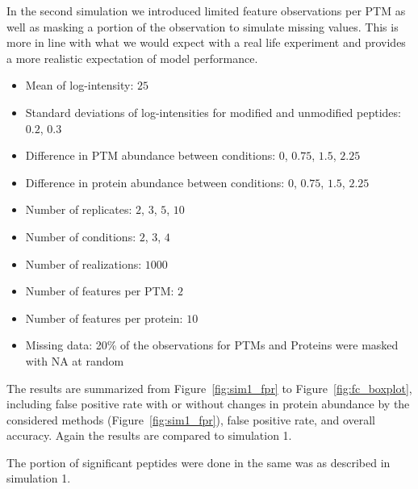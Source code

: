 \documentclass{mcp}
\def\sfigref#1{{Figure~\ref{#1}}}
\begin{document}
In the second simulation we introduced limited feature observations per PTM as well as masking a portion of the observation to simulate missing values. This is more in line with what we would expect with a real life experiment and provides a more realistic expectation of model performance.

\begin{itemize}
\item Mean of log-intensity: $25$
\item Standard deviations of log-intensities for modified and unmodified peptides: $0.2$, $0.3$
\item Difference in PTM abundance between conditions: $0$, $0.75$, $1.5$, $2.25$
\item Difference in protein abundance between conditions: $0$, $0.75$, $1.5$, $2.25$
\item Number of replicates: $2$, $3$, $5$, $10$
\item Number of conditions: $2$, $3$, $4$
\item Number of realizations: $1000$
\item Number of features per PTM: $2$
\item Number of features per protein: $10$
\item Missing data: 20\% of the observations for PTMs and Proteins were masked with NA at random
\end{itemize}

The results are summarized from \sfigref{fig:sim1_fpr} to \sfigref{fig:fc_boxplot}, including false positive rate with or without changes in protein abundance by the considered methods (\sfigref{fig:sim1_fpr}), false positive rate, and overall accuracy. Again the results are compared to simulation 1.

The portion of significant peptides were done in the same was as described in simulation 1.
\end{document}
